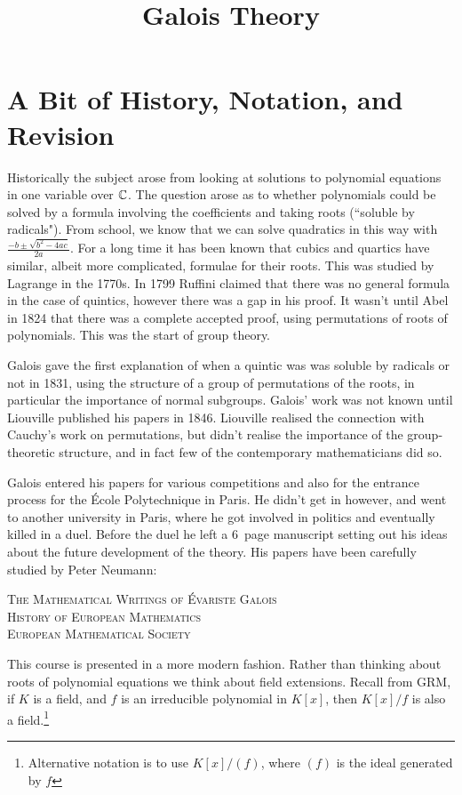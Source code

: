 \documentclass[10pt,a4paper]{article}
\title{Galois Theory}
\begin{document}
\maketitle
\section{A Bit of History, Notation, and Revision}
Historically the subject arose from looking at solutions to polynomial equations in one variable over $\mathbb{C}$. The question arose as to whether polynomials could be solved by a formula involving the coefficients and taking roots (``soluble by radicals"). From school, we know that we can solve quadratics in this way with $\frac{-b\pm\sqrt{b^2-4ac}}{2a}$. For a long time it has been known that cubics and quartics have similar, albeit more complicated, formulae for their roots. This was studied by Lagrange in the 1770s. In 1799 Ruffini claimed that there was no general formula in the case of quintics, however there was a gap in his proof. It wasn't until Abel in 1824 that there was a complete accepted proof, using permutations of roots of polynomials. This was the start of group theory.

Galois gave the first explanation of when a quintic was was soluble by radicals or not in 1831, using the structure of a group of permutations of the roots, in particular the importance of normal subgroups. Galois' work was not known until Liouville published his papers in 1846. Liouville realised the connection with Cauchy's work on permutations, but didn't realise the importance of the group-theoretic structure, and in fact few of the contemporary mathematicians did so.

Galois entered his papers for various competitions and also for the entrance process for the \'Ecole Polytechnique in Paris. He didn't get in however, and went to another university in Paris, where he got involved in politics and eventually killed in a duel. Before the duel he left a 6\textonehalf\, page manuscript setting out his ideas about the future development of the theory. His papers have been carefully studied by Peter Neumann:
\begin{center}
\textsc{
The Mathematical Writings of \'Evariste Galois\\History of European Mathematics\\European Mathematical Society
}
\end{center}

This course is presented in a more modern fashion. Rather than thinking about roots of polynomial equations we think about field extensions. Recall from GRM, if $K$ is a field, and $f$ is an irreducible polynomial in $K[x]$, then $K[x]/f$ is also a field.\footnote{Alternative notation is to use $K[x]/(f)$, where $(f)$ is the ideal generated by $f$}
\end{document}
